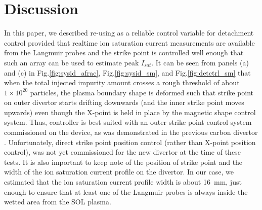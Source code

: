 \section{Discussion}
\label{sec:discussion}

In this paper, we described re-using \Afrac as a reliable control variable for detachment control provided that realtime ion saturation current measurements are available from the Langmuir probes and the strike point is controlled well enough that such an array can be used to estimate peak $I_{sat}$.
It can be seen from panels (a) and (c) in Fig.\ref{fig:sysid_afrac}, Fig.\ref{fig:sysid_sm}, and Fig.\ref{fig:detctrl_sm} that when the total injected impurity amount crosses a rough threshold of about $1\times10^{20}$ particles, the plasma boundary shape is deformed such that strike point on outer divertor starts drifting downwards (and the inner strike point moves upwards) even though the X-point is held in place by the magnetic shape control system.
Thus, \Afrac controller is best suited with an outer strike point control system commissioned on the device, as was demonstrated in the previous carbon divertor \cite{Eldon_2022_PPCF}.
Unfortunately, direct strike point position control (rather than X-point position control), was not yet commissioned for the new divertor at the time of these tests.
It is also important to keep note of the position of strike point and the width of the ion saturation current profile on the divertor.
In our case, we estimated that the ion saturation current profile width is about 16~mm, just enough to ensure that at least one of the Langmuir probes is always inside the wetted area from the \ac{SOL} plasma.
